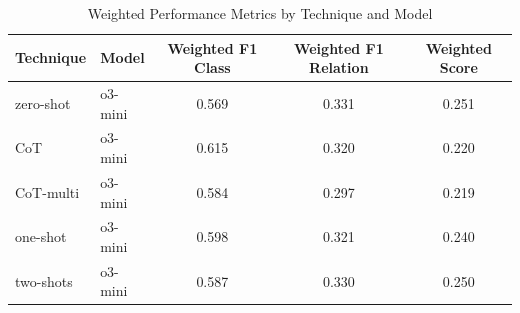 \begin{table}[htbp]
\centering
\caption{Weighted Performance Metrics by Technique and Model}
\begin{tabular}{llccc}
\toprule
\textbf{Technique} & \textbf{Model} & \textbf{Weighted F1 Class} & \textbf{Weighted F1 Relation} & \textbf{Weighted Score} \\
\midrule
zero-shot & o3-mini & 0.569 & 0.331 & 0.251 \\
\midrule
CoT & o3-mini & 0.615 & 0.320 & 0.220 \\
\midrule
CoT-multi & o3-mini & 0.584 & 0.297 & 0.219 \\
\midrule
one-shot & o3-mini & 0.598 & 0.321 & 0.240 \\
\midrule
two-shots & o3-mini & 0.587 & 0.330 & 0.250 \\
\bottomrule
\end{tabular}
\label{tab:weighted_performance}
\end{table}